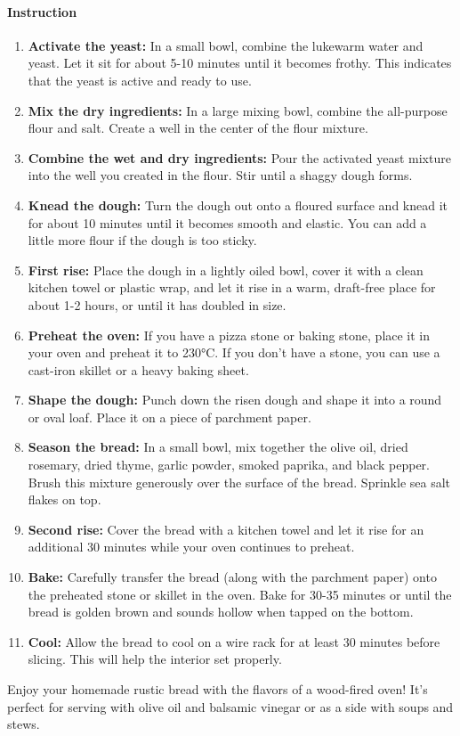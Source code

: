 \paragraph{Instruction}
\begin{enumerate}[noitemsep]
	\item \textbf{Activate the yeast:} In a small bowl, combine the lukewarm water and yeast. Let it sit for about 5-10 minutes until it becomes frothy. This indicates that the yeast is active and ready to use.
	\item \textbf{Mix the dry ingredients:} In a large mixing bowl, combine the all-purpose flour and salt. Create a well in the center of the flour mixture.
	\item \textbf{Combine the wet and dry ingredients:} Pour the activated yeast mixture into the well you created in the flour. Stir until a shaggy dough forms.
	\item \textbf{Knead the dough:} Turn the dough out onto a floured surface and knead it for about 10 minutes until it becomes smooth and elastic. You can add a little more flour if the dough is too sticky.
	\item \textbf{First rise:} Place the dough in a lightly oiled bowl, cover it with a clean kitchen towel or plastic wrap, and let it rise in a warm, draft-free place for about 1-2 hours, or until it has doubled in size.
	\item \textbf{Preheat the oven:} If you have a pizza stone or baking stone, place it in your oven and preheat it to 230°C. If you don't have a stone, you can use a cast-iron skillet or a heavy baking sheet.
	\item \textbf{Shape the dough:} Punch down the risen dough and shape it into a round or oval loaf. Place it on a piece of parchment paper.
	\item \textbf{Season the bread:} In a small bowl, mix together the olive oil, dried rosemary, dried thyme, garlic powder, smoked paprika, and black pepper. Brush this mixture generously over the surface of the bread. Sprinkle sea salt flakes on top.
	\item \textbf{Second rise:} Cover the bread with a kitchen towel and let it rise for an additional 30 minutes while your oven continues to preheat.
	\item \textbf{Bake:} Carefully transfer the bread (along with the parchment paper) onto the preheated stone or skillet in the oven. Bake for 30-35 minutes or until the bread is golden brown and sounds hollow when tapped on the bottom.
	\item \textbf{Cool:} Allow the bread to cool on a wire rack for at least 30 minutes before slicing. This will help the interior set properly.
\end{enumerate}
Enjoy your homemade rustic bread with the flavors of a wood-fired oven! It's perfect for serving with olive oil and balsamic vinegar or as a side with soups and stews.
\clearpage
